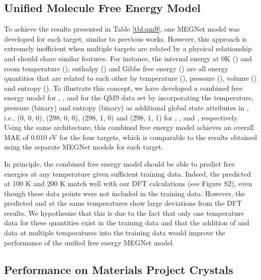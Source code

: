\documentclass[manuscript=article]{achemso}
\begin{document}
\subsection{Unified Molecule Free Energy Model}

To achieve the results presented in Table \ref{tbl:qm9}, one MEGNet model was developed for each target, similar to previous works.\cite{Schutt2018,gilmer2017neural} However, this approach is extremely inefficient when multiple targets are related by a physical relationship and should share similar features. For instance, the internal energy at 0K () and room temperature (), enthalpy () and Gibbs free energy () are all energy quantities that are related to each other by temperature (), pressure (), volume () and entropy (). To illustrate this concept, we have developed a combined free energy model for , ,  and  for the QM9 data set by incorporating the temperature, pressure (binary) and entropy (binary) as additional global state attributes in , i.e., (0, 0, 0), (298, 0, 0), (298, 1, 0) and (298, 1, 1) for , ,  and , respectively. Using the same architecture, this combined free energy model achieves an overall MAE of 0.010 eV for the four targets, which is comparable to the results obtained using the separate MEGNet models for each target.

In principle, the combined free energy  model should be able to predict free energies at any temperature given sufficient training data. Indeed, the predicted  at 100 K and 200 K match well with our DFT calculations (see Figure S2), even though these data points were not included in the training data. However, the predicted  and  at the same temperatures show large deviations from the DFT results. We hypothesize that this is due to the fact that only one temperature data for these quantities exist in the training data and that the addition of  and  data at multiple temperatures into the training data would improve the performance of the unified free energy MEGNet model.

\subsection{Performance on Materials Project Crystals}
\end{document}

